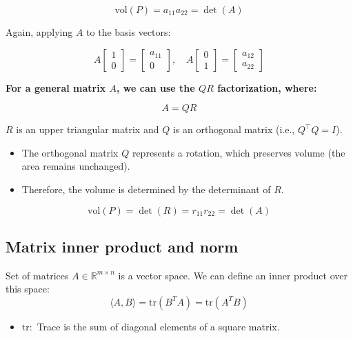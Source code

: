 \begin{intuition}
    \[
    \text{vol}(P) = a_{11} a_{22} = \det(A)
    \]

    Again, applying $A$ to the basis vectors:

    \[
    A \begin{bmatrix} 1 \\ 0 \end{bmatrix} = \begin{bmatrix} a_{11} \\ 0 \end{bmatrix}, \quad A \begin{bmatrix} 0 \\ 1 \end{bmatrix} = \begin{bmatrix} a_{12} \\ a_{22} \end{bmatrix}
    \]

    \textbf{For a general matrix $A$, we can use the $QR$ factorization, where:}

    \[
    A = QR
    \]

    $R$ is an upper triangular matrix and $Q$ is an orthogonal matrix (i.e., $Q^\top Q = I$). 
    \begin{itemize}
        \item The orthogonal matrix $Q$ represents a rotation, which preserves volume (the area remains unchanged). 
        \item Therefore, the volume is determined by the determinant of $R$.
    \end{itemize}

    \[
    \text{vol}(P) = \det(R) = r_{11} r_{22} = \det(A)
    \]

\end{intuition}

\subsection{Matrix inner product and norm}
\begin{definition}
    Set of matrices $A \in \mathbb{R}^{m \times n}$ is a vector space. We can define an inner product over this space:
    \begin{equation}
        \langle A, B \rangle = \text{tr}(B^T A) = \text{tr}(A^T B)
    \end{equation}
    \begin{itemize}
        \item $\text{tr}:$ Trace is the sum of diagonal elements of a square matrix.
    \end{itemize}
\end{definition}

